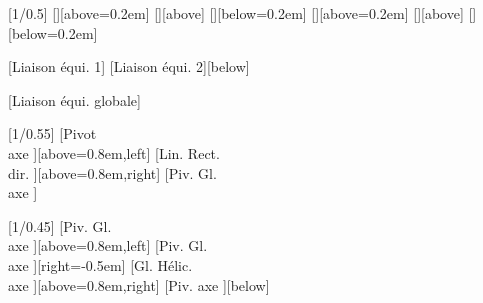 \documentclass[11pt]{article}
\begin{document}

\begin{grapheLiaisons}[scale=0.5]
[1/0.5]
[][above=0.2em]
[][above]
[][below=0.2em]
[][above=0.2em]
[][above]
[][below=0.2em]
\end{grapheLiaisons}


\begin{grapheLiaisons}[scale=0.5]
[Liaison équi. 1]
[Liaison équi. 2][below]
\end{grapheLiaisons}


\begin{grapheLiaisons}[scale=0.5]
[Liaison équi. globale]
\end{grapheLiaisons}


\begin{grapheLiaisons}[scale=0.55]
[1/0.55]
[Pivot\\ axe ][above=0.8em,left]
[Lin. Rect.\\ dir. ][above=0.8em,right]
[Piv. Gl.\\ axe ]
\end{grapheLiaisons}


\begin{grapheLiaisons}[scale=0.45]
[1/0.45]
[Piv. Gl.\\ axe ][above=0.8em,left]
[Piv. Gl.\\ axe ][right=-0.5em]
[Gl. Hélic.\\ axe ][above=0.8em,right]
[Piv. axe ][below]
\end{grapheLiaisons}
\end{document}
